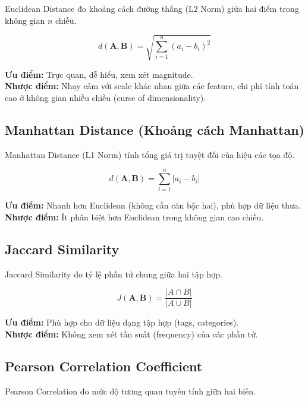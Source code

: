 \documentclass[12pt,a4paper]{article}
\begin{document}
Euclidean Distance đo khoảng cách đường thẳng (L2 Norm) giữa hai điểm trong không gian $n$ chiều.

\begin{equation}
d(\mathbf{A}, \mathbf{B}) = \sqrt{\sum_{i=1}^{n} (a_i - b_i)^2}
\label{eq:euclidean}
\end{equation}

\noindent\textbf{Ưu điểm:} Trực quan, dễ hiểu, xem xét magnitude.\\
\noindent\textbf{Nhược điểm:} Nhạy cảm với scale khác nhau giữa các feature, chi phí tính toán cao ở không gian nhiều chiều (curse of dimensionality).

\subsection{Manhattan Distance (Khoảng cách Manhattan)}

Manhattan Distance (L1 Norm) tính tổng giá trị tuyệt đối của hiệu các tọa độ.

\begin{equation}
d(\mathbf{A}, \mathbf{B}) = \sum_{i=1}^{n} |a_i - b_i|
\label{eq:manhattan}
\end{equation}

\noindent\textbf{Ưu điểm:} Nhanh hơn Euclidean (không cần căn bậc hai), phù hợp dữ liệu thưa.\\
\noindent\textbf{Nhược điểm:} Ít phân biệt hơn Euclidean trong không gian cao chiều.

\subsection{Jaccard Similarity}

Jaccard Similarity đo tỷ lệ phần tử chung giữa hai tập hợp.

\begin{equation}
J(\mathbf{A}, \mathbf{B}) = \frac{|A \cap B|}{|A \cup B|}
\label{eq:jaccard}
\end{equation}

\noindent\textbf{Ưu điểm:} Phù hợp cho dữ liệu dạng tập hợp (tags, categories).\\
\noindent\textbf{Nhược điểm:} Không xem xét tần suất (frequency) của các phần tử.

\subsection{Pearson Correlation Coefficient}

Pearson Correlation đo mức độ tương quan tuyến tính giữa hai biến.
\end{document}
